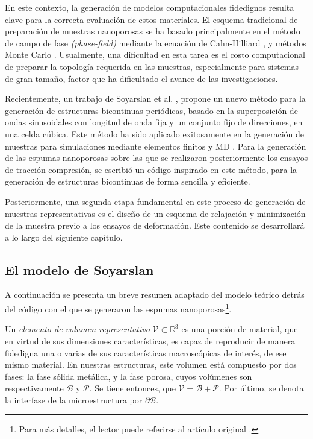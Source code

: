 \documentclass{article}
\begin{document}
En este contexto, la generación de modelos computacionales fidedignos resulta clave para la correcta evaluación de estos materiales. El esquema tradicional de preparación de muestras nanoporosas se ha basado principalmente en el método de campo de fase \textit{(phase-field)} mediante la ecuación de Cahn-Hilliard \cite{CROWSON2007,Farkas2013}, y métodos Monte Carlo \cite{Ngo2015}. Usualmente, una dificultad en esta tarea es el costo computacional de preparar la topología requerida en las muestras, especialmente para sistemas de gran tamaño, factor que ha dificultado el avance de las investigaciones. 

Recientemente, un trabajo de Soyarslan et al. \cite{Soyarslan2018}, propone un nuevo método para la generación de estructuras bicontinuas periódicas, basado en la superposición de ondas sinusoidales con longitud de onda fija y un conjunto fijo de direcciones, en una celda cúbica. Este método ha sido aplicado exitosamente en la generación de muestras para simulaciones mediante elementos finitos \cite{Soyarslan2018} y MD \cite{Liu2019}. Para la generación de las espumas nanoporosas sobre las que se realizaron posteriormente los ensayos de tracción-compresión, se escribió un código inspirado en este método, para la generación de estructuras bicontinuas de forma sencilla y eficiente.

Posteriormente, una segunda etapa fundamental en este proceso de generación de muestras representativas es el diseño de un esquema de relajación y minimización de la muestra previo a los ensayos de deformación. Este contenido se desarrollará a lo largo del siguiente capítulo.

\subsection{El modelo de Soyarslan}
A continuación se presenta un breve resumen adaptado del modelo teórico detrás del código con el que se generaron las espumas nanoporosas\footnote{Para más detalles, el lector puede referirse al artículo original \cite{Soyarslan2018}.}.

Un \textit{elemento de volumen representativo} $\mathcal{V}\subset \mathbb{R}^3$ es una porción de material, que en virtud de sus dimensiones características, es capaz de reproducir de manera fidedigna una o varias de sus características macroscópicas de interés, de ese mismo material. En nuestras estructuras, este volumen está compuesto por dos fases: la fase sólida metálica, y la fase porosa, cuyos volúmenes son respectivamente $\mathcal{B}$ y $\mathcal{P}$. Se tiene entonces, que $\mathcal{V} = \mathcal{B}+\mathcal{P}$. Por último, se denota la interfase de la microestructura por $\partial\mathcal{B}$.
\end{document}
